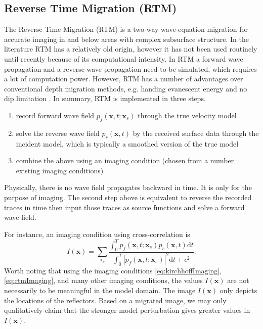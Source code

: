 \documentclass[11pt,titlepage]{article}
\newcommand{\bx}{\boldsymbol{x}}
\theoremstyle{plain}
\theoremstyle{definition}
\theoremstyle{remark}
\numberwithin{equation}{section}
\begin{document}
\subsection{Reverse Time Migration (RTM)}
The Reverse Time Migration (RTM) is a two-way wave-equation migration for accurate imaging in and below areas with complex subsurface structure. In the literature RTM has a relatively old origin, however it has not been used routinely until recently because of its
computational intensity. In RTM a forward wave propagation and a reverse wave propagation need to be 
simulated, which requires a lot of computation power. However, RTM has a number of advantages over conventional depth migration methods, e.g.
handing evanescent energy and no dip limitation \cite{McMechan:1983aa, Baysal:1983aa}. In summary, RTM is implemented in three steps. 
\begin{enumerate}
\item record forward wave field $p_f(\bx, t; \bx_s)$ through the true velocity model
\item solve the reverse wave field $p_r(\bx, t)$ by the received surface data through the incident model, which is typically a smoothed version of the true model
\item combine the above using an imaging condition (chosen from a number existing imaging conditions)
\end{enumerate}
Physically, there is no wave field propagates backward in time. It is only for the purpose of imaging. The second step above is equivalent to reverse the recorded traces in time then input those traces as source functions and solve a forward wave field. 

For instance, an imaging condition using cross-correlation is 
\begin{equation}
\label{eq:rtmImaging}
I(\bx) = \sum_{\bx_s} \frac{\int_0^T p_f(\bx, t; \bx_s)p_r(\bx, t)\mathrm{d}t}{\int_0^T |p_f(\bx, t; \bx_s)|^2\mathrm{d}t + \epsilon^2}.
\end{equation}
Worth noting that using the imaging conditions \eqref{eq:kirchhoffImaging}, \eqref{eq:rtmImaging}, and many other imaging conditions, the values $I(\bx)$ are not necessarily to be meaningful in the model domain. The image $I(\bx)$ only depicts the locations of the reflectors. Based on a migrated image, we may only qualitatively claim that the stronger model perturbation gives greater values in $I(\bx)$. 
\end{document}
